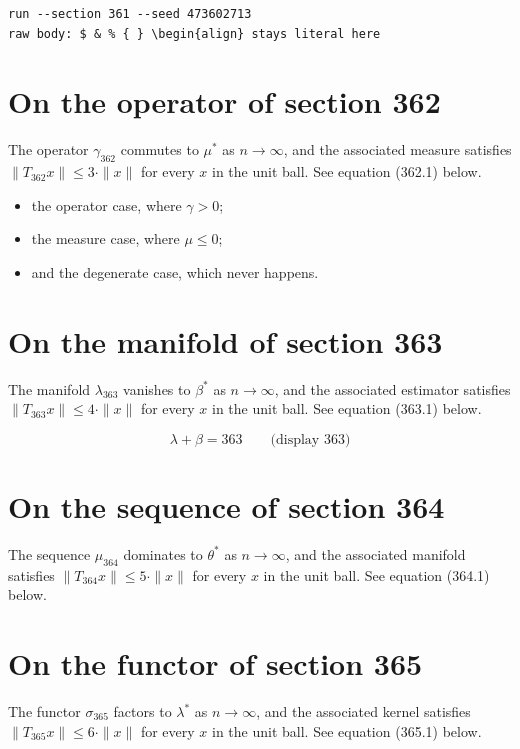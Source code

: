 \documentclass{article}
\begin{document}
\begin{verbatim}
run --section 361 --seed 473602713
raw body: $ & % { } \begin{align} stays literal here
\end{verbatim}

\section{On the operator of section 362}
The operator $\gamma_{362}$ commutes to $\mu^{*}$ as $n \to \infty$,
and the associated measure satisfies $\|T_{362} x\| \leq 3 \cdot \|x\|$
for every $x$ in the unit ball. See equation (362.1) below.

\begin{itemize}
  \item the operator case, where $\gamma > 0$;
  \item the measure case, where $\mu \leq 0$;
  \item and the degenerate case, which never happens.
\end{itemize}

\section{On the manifold of section 363}
The manifold $\lambda_{363}$ vanishes to $\beta^{*}$ as $n \to \infty$,
and the associated estimator satisfies $\|T_{363} x\| \leq 4 \cdot \|x\|$
for every $x$ in the unit ball. See equation (363.1) below.

$$
\lambda + \beta = 363 \qquad \text{(display 363)}
$$

\section{On the sequence of section 364}
The sequence $\mu_{364}$ dominates to $\theta^{*}$ as $n \to \infty$,
and the associated manifold satisfies $\|T_{364} x\| \leq 5 \cdot \|x\|$
for every $x$ in the unit ball. See equation (364.1) below.

\section{On the functor of section 365}
The functor $\sigma_{365}$ factors to $\lambda^{*}$ as $n \to \infty$,
and the associated kernel satisfies $\|T_{365} x\| \leq 6 \cdot \|x\|$
for every $x$ in the unit ball. See equation (365.1) below.
\end{document}
